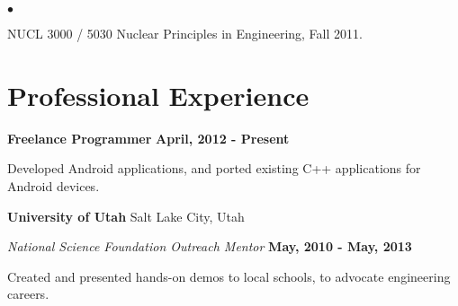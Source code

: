 \documentclass[margin,line]{res}
\newenvironment{list1}{
  \begin{list}{\ding{113}}{%
      \setlength{\itemsep}{0in}
      \setlength{\parsep}{0in} \setlength{\parskip}{0in}
      \setlength{\topsep}{0in} \setlength{\partopsep}{0in} 
      \setlength{\leftmargin}{0.17in}}}{\end{list}}
\newenvironment{list2}{
  \begin{list}{$\bullet$}{%
      \setlength{\itemsep}{0in}
      \setlength{\parsep}{0in} \setlength{\parskip}{0in}
      \setlength{\topsep}{0in} \setlength{\partopsep}{0in} 
      \setlength{\leftmargin}{0.2in}}}{\end{list}}
\begin{document}
\begin{resume}
\begin{list1}
\vspace*{.05in}  
\begin{list2}
\item NUCL 3000 / 5030  Nuclear Principles in Engineering, Fall 2011.
\end{list2}
\end{list1}




\section{\sc Professional Experience}
{\bf Freelance Programmer} \hfill{\bf April, 2012 - Present}

\begin{list1}
\item[] Developed Android applications, and ported existing C++ applications for Android devices.
\end{list1}


{\bf University of Utah} \hfill{ Salt Lake City, Utah}

\vspace*{-.05in}
{\em National Science Foundation Outreach Mentor} \hfill {\bf May, 2010 - May, 2013}

\begin{list1}
\item[] Created and presented hands-on demos to local schools, to advocate engineering careers.
\end{list1}






\end{resume}
\end{document}

